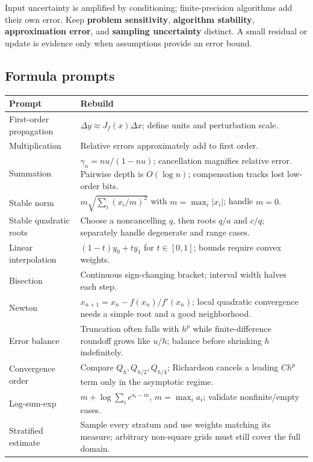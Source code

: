 Input uncertainty is amplified by conditioning; finite-precision algorithms add their own error. Keep \textbf{problem sensitivity}, \textbf{algorithm stability}, \textbf{approximation error}, and \textbf{sampling uncertainty} distinct. A small residual or update is evidence only when assumptions provide an error bound.

\subsection{Formula prompts}\label{formula-prompts-1}

{\def\LTcaptype{none} %
\begin{longtable}[]{@{}
  >{\raggedright\arraybackslash}p{}
  >{\raggedright\arraybackslash}p{}@{}}
\toprule\noalign{}
\begin{minipage}[b]{\linewidth}\raggedright
Prompt
\end{minipage} & \begin{minipage}[b]{\linewidth}\raggedright
Rebuild
\end{minipage} \\
\midrule\noalign{}
\endhead
\bottomrule\noalign{}
\endlastfoot
First-order propagation & \(\Delta y\approx J_f(x)\Delta x\); define units and perturbation scale. \\
Multiplication & Relative errors approximately add to first order. \\
Summation & \(\gamma_n=nu/(1-nu)\); cancellation magnifies relative error. Pairwise depth is \(O(\log n)\); compensation tracks lost low-order bits. \\
Stable norm & \(m\sqrt{\sum_i(x_i/m)^2}\) with \(m=\max_i|x_i|\); handle \(m=0\). \\
Stable quadratic roots & Choose a noncancelling \(q\), then roots \(q/a\) and \(c/q\); separately handle degenerate and range cases. \\
Linear interpolation & \((1-t)y_0+ty_1\) for \(t\in[0,1]\); bounds require convex weights. \\
Bisection & Continuous sign-changing bracket; interval width halves each step. \\
Newton & \(x_{n+1}=x_n-f(x_n)/f'(x_n)\); local quadratic convergence needs a simple root and a good neighborhood. \\
Error balance & Truncation often falls with \(h^p\) while finite-difference roundoff grows like \(u/h\); balance before shrinking \(h\) indefinitely. \\
Convergence order & Compare \(Q_h,Q_{h/2},Q_{h/4}\); Richardson cancels a leading \(Ch^p\) term only in the asymptotic regime. \\
Log-sum-exp & \(m+\log\sum_i e^{a_i-m}\), \(m=\max_i a_i\); validate nonfinite/empty cases. \\
Stratified estimate & Sample every stratum and use weights matching its measure; arbitrary non-square grids must still cover the full domain. \\
\end{longtable}
}

